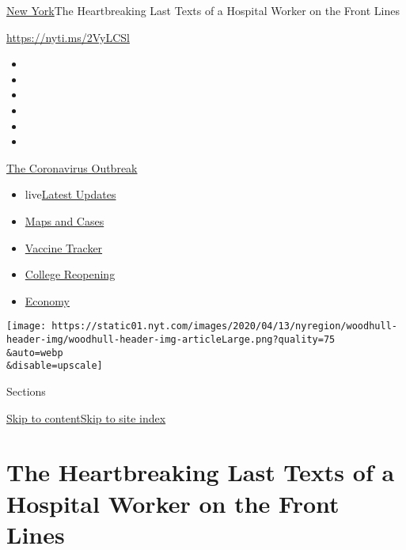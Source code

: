 \href{/section/nyregion}{New York}\textbar{}The Heartbreaking Last Texts
of a Hospital Worker on the Front Lines

\url{https://nyti.ms/2VyLCSl}

\begin{itemize}
\item
\item
\item
\item
\item
\item
\end{itemize}

\href{https://www.nytimes.com/news-event/coronavirus?action=click\&pgtype=Article\&state=default\&region=TOP_BANNER\&context=storylines_menu}{The
Coronavirus Outbreak}

\begin{itemize}
\tightlist
\item
  live\href{https://www.nytimes.com/2020/08/04/world/coronavirus-cases.html?action=click\&pgtype=Article\&state=default\&region=TOP_BANNER\&context=storylines_menu}{Latest
  Updates}
\item
  \href{https://www.nytimes.com/interactive/2020/us/coronavirus-us-cases.html?action=click\&pgtype=Article\&state=default\&region=TOP_BANNER\&context=storylines_menu}{Maps
  and Cases}
\item
  \href{https://www.nytimes.com/interactive/2020/science/coronavirus-vaccine-tracker.html?action=click\&pgtype=Article\&state=default\&region=TOP_BANNER\&context=storylines_menu}{Vaccine
  Tracker}
\item
  \href{https://www.nytimes.com/2020/08/02/us/covid-college-reopening.html?action=click\&pgtype=Article\&state=default\&region=TOP_BANNER\&context=storylines_menu}{College
  Reopening}
\item
  \href{https://www.nytimes.com/live/2020/08/04/business/stock-market-today-coronavirus?action=click\&pgtype=Article\&state=default\&region=TOP_BANNER\&context=storylines_menu}{Economy}
\end{itemize}

\texttt{[image: https://static01.nyt.com/images/2020/04/13/nyregion/woodhull-header-img/woodhull-header-img-articleLarge.png?quality=75\\\&auto=webp\\\&disable=upscale]}

Sections

\protect\hyperlink{site-content}{Skip to
content}\protect\hyperlink{site-index}{Skip to site index}

\hypertarget{the-heartbreaking-last-texts-of-a-hospital-worker-on-the-front-lines}{%
\section{The Heartbreaking Last Texts of a Hospital Worker on the Front
Lines}\label{the-heartbreaking-last-texts-of-a-hospital-worker-on-the-front-lines}}

